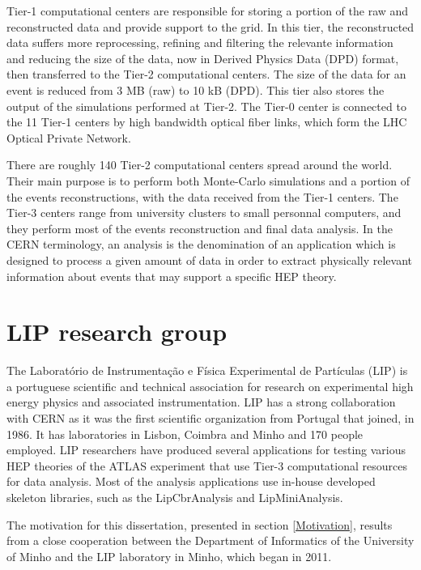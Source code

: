 Tier-1 computational centers are responsible for storing a portion of the raw and reconstructed data and provide support to the grid. In this tier, the reconstructed data suffers more reprocessing, refining and filtering the relevante information and reducing the size of the data, now in Derived Physics Data (DPD) format, then transferred to the Tier-2 computational centers. The size of the data for an event is reduced from 3 MB (raw) to 10 kB (DPD). This tier also stores the output of the simulations performed at Tier-2. The Tier-0 center is connected to the 11 Tier-1 centers by high bandwidth optical fiber links, which form the LHC Optical Private Network.

There are roughly 140 Tier-2 computational centers spread around the world. Their main purpose is to perform both Monte-Carlo simulations and a portion of the events reconstructions, with the data received from the Tier-1 centers. The Tier-3 centers range from university clusters to small personnal computers, and they perform most of the events reconstruction and final data analysis. In the CERN terminology, an analysis is the denomination of an application which is designed to process a given amount of data in order to extract physically relevant information about events that may support a specific HEP theory.

\section{LIP research group}
\label{LIP}

The Laboratório de Instrumentação e Física Experimental de Partículas (LIP) \cite{LIP} is a portuguese scientific and technical association for research on experimental high energy physics and associated instrumentation. LIP has a strong collaboration with CERN as it was the first scientific organization from Portugal that joined, in 1986. It has laboratories in Lisbon, Coimbra and Minho and 170 people employed. LIP researchers have produced several applications for testing various HEP theories of the ATLAS experiment that use Tier-3 computational resources for data analysis. Most of the analysis applications use in-house developed skeleton libraries, such as the LipCbrAnalysis and LipMiniAnalysis.

The motivation for this dissertation, presented in section \ref{Motivation}, results from a close cooperation between the Department of Informatics of the University of Minho and the LIP laboratory in Minho, which began in 2011.

